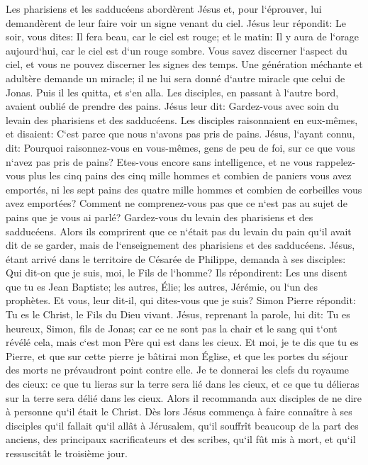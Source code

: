 \verse Les pharisiens et les sadducéens abordèrent Jésus et, pour l`éprouver, lui demandèrent de leur faire voir un signe venant du ciel. 
\verse Jésus leur répondit: Le soir, vous dites: Il fera beau, car le ciel est rouge; et le matin: 
\verse Il y aura de l`orage aujourd`hui, car le ciel est d`un rouge sombre. Vous savez discerner l`aspect du ciel, et vous ne pouvez discerner les signes des temps. 
\verse Une génération méchante et adultère demande un miracle; il ne lui sera donné d`autre miracle que celui de Jonas. Puis il les quitta, et s`en alla. 
\verse Les disciples, en passant à l`autre bord, avaient oublié de prendre des pains. 
\verse Jésus leur dit: Gardez-vous avec soin du levain des pharisiens et des sadducéens. 
\verse Les disciples raisonnaient en eux-mêmes, et disaient: C`est parce que nous n`avons pas pris de pains. 
\verse Jésus, l`ayant connu, dit: Pourquoi raisonnez-vous en vous-mêmes, gens de peu de foi, sur ce que vous n`avez pas pris de pains? 
\verse Etes-vous encore sans intelligence, et ne vous rappelez-vous plus les cinq pains des cinq mille hommes et combien de paniers vous avez emportés, 
\verse ni les sept pains des quatre mille hommes et combien de corbeilles vous avez emportées? 
\verse Comment ne comprenez-vous pas que ce n`est pas au sujet de pains que je vous ai parlé? Gardez-vous du levain des pharisiens et des sadducéens. 
\verse Alors ils comprirent que ce n`était pas du levain du pain qu`il avait dit de se garder, mais de l`enseignement des pharisiens et des sadducéens. 
\verse Jésus, étant arrivé dans le territoire de Césarée de Philippe, demanda à ses disciples: Qui dit-on que je suis, moi, le Fils de l`homme? 
\verse Ils répondirent: Les uns disent que tu es Jean Baptiste; les autres, Élie; les autres, Jérémie, ou l`un des prophètes. 
\verse Et vous, leur dit-il, qui dites-vous que je suis? 
\verse Simon Pierre répondit: Tu es le Christ, le Fils du Dieu vivant. 
\verse Jésus, reprenant la parole, lui dit: Tu es heureux, Simon, fils de Jonas; car ce ne sont pas la chair et le sang qui t`ont révélé cela, mais c`est mon Père qui est dans les cieux. 
\verse Et moi, je te dis que tu es Pierre, et que sur cette pierre je bâtirai mon Église, et que les portes du séjour des morts ne prévaudront point contre elle. 
\verse Je te donnerai les clefs du royaume des cieux: ce que tu lieras sur la terre sera lié dans les cieux, et ce que tu délieras sur la terre sera délié dans les cieux. 
\verse Alors il recommanda aux disciples de ne dire à personne qu`il était le Christ. 
\verse Dès lors Jésus commença à faire connaître à ses disciples qu`il fallait qu`il allât à Jérusalem, qu`il souffrît beaucoup de la part des anciens, des principaux sacrificateurs et des scribes, qu`il fût mis à mort, et qu`il ressuscitât le troisième jour. 
